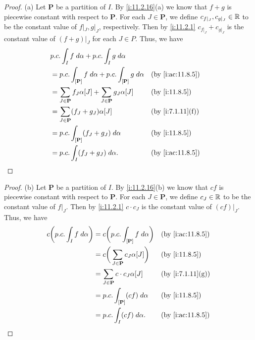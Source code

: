 \begin{proof}{(a)}
  Let \(\mathbf{P}\) be a partition of \(I\).
  By \cref{i:11.2.16}(a) we know that \(f + g\) is piecewise constant with respect to \(\mathbf{P}\).
  For each \(J \in \mathbf{P}\), we define \(c_{f|_J}, c_{g|_J} \in \mathbb{R}\) to be the constant value of \(f|_J, g|_J\), respectively.
  Then by \cref{i:11.2.1} \(c_{f|_J} + c_{g|_J}\) is the constant value of \((f + g)|_J\) for each \(J \in P\).
  Thus, we have
  \begin{align*}
     & p.c. \int_I f \; d \alpha + p.c. \int_I g \; d \alpha                                                   \\
     & = p.c. \int_{[\mathbf{P}]} f \; d \alpha + p.c. \int_{[\mathbf{P}]} g \; d \alpha &  & \by{i:ac:11.8.5} \\
     & = \sum_{J \in \mathbf{P}} f_J \alpha[J] + \sum_{J \in \mathbf{P}} g_J \alpha[J]   &  & \by{i:11.8.5}    \\
     & = \sum_{J \in \mathbf{P}} (f_J + g_J) \alpha[J]                                   &  & \by{i:7.1.11}[f] \\
     & = p.c. \int_{[\mathbf{P}]} (f_J + g_J) \; d \alpha                                &  & \by{i:11.8.5}    \\
     & = p.c. \int_I (f_J + g_J) \; d \alpha.                                            &  & \by{i:ac:11.8.5}
  \end{align*}
\end{proof}

\begin{proof}{(b)}
  Let \(\mathbf{P}\) be a partition of \(I\).
  By \cref{i:11.2.16}(b) we know that \(cf\) is piecewise constant with respect to \(\mathbf{P}\).
  For each \(J \in \mathbf{P}\), we define \(c_J \in \mathbb{R}\) to be the constant value of \(f|_J\).
  Then by \cref{i:11.2.1} \(c \cdot c_J\) is the constant value of \((cf)|_J\).
  Thus, we have
  \begin{align*}
    c \bigg(p.c. \int_I f \; d \alpha\bigg) & = c \bigg(p.c. \int_{[\mathbf{P}]} f \; d \alpha\bigg) &  & \by{i:ac:11.8.5} \\
                                            & = c \bigg(\sum_{J \in \mathbf{P}} c_J \alpha[J]\bigg)  &  & \by{i:11.8.5}    \\
                                            & = \sum_{J \in \mathbf{P}} c \cdot c_J \alpha[J]        &  & \by{i:7.1.11}[g] \\
                                            & = p.c. \int_{[\mathbf{P}]} (c f) \; d \alpha           &  & \by{i:11.8.5}    \\
                                            & = p.c. \int_I (c f) \; d \alpha.                       &  & \by{i:ac:11.8.5}
  \end{align*}
\end{proof}

